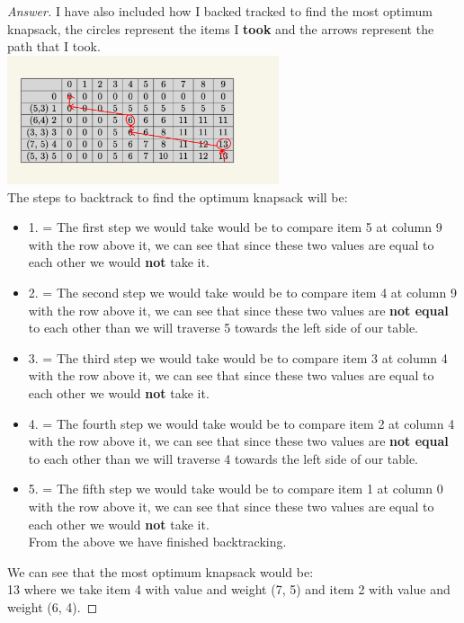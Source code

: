 \documentclass[11pt]{article}
\theoremstyle{definition}
\theoremstyle{definition}
\theoremstyle{definition}
\begin{document}
\begin{proof}[Answer]
I have also included how I backed tracked to find the most optimum knapsack, the circles represent the items I \textbf{took} and the arrows represent the path that I took. \\
\includegraphics[width=0.6\textwidth]{IMG_5D67C562AAD8-1.jpeg}\\
The steps to backtrack to find the optimum knapsack will be: \\
\begin{itemize}
\item1. = \textrm{The first step we would take would be to compare item 5 at column 9 with the row above it, we can see that since these two values are equal to each other we would \textbf{not} take it.} \\
\item2. = \textrm{The second step we would take would be to compare item 4 at column 9 with the row above it, we can see that since these two values are \textbf{ not equal} to each other than we will traverse 5 towards the left side of our table.} \\
\item3. = \textrm{The third step we would take would be to compare item 3 at column 4 with the row above it, we can see that since these two values are equal to each other we would \textbf{not} take it.} \\
\item4. = \textrm{The fourth step we would take would be to compare item 2 at column 4 with the row above it, we can see that since these two values are \textbf{ not equal} to each other than we will traverse 4 towards the left side of our table.} \\
\item5. = \textrm{The fifth step we would take would be to compare item 1 at column 0 with the row above it, we can see that since these two values are equal to each other we would \textbf{not} take it.} \\
\textrm{From the above we have finished backtracking.}
\end{itemize}
We can see that the most optimum knapsack would be: \\
13 where we take item 4 with value and weight (7, 5) and item 2 with value and weight (6, 4).
\end{proof}
\end{document}

